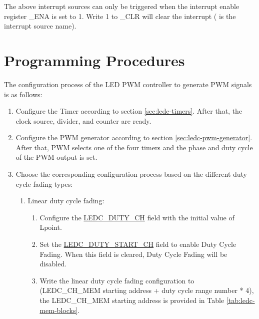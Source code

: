 \documentclass[main\_\_EN.tex]{subfiles}
\begin{document}
The above interrupt sources can only be triggered when the interrupt enable register \_ENA is set to 1. Write 1 to \_CLR will clear the interrupt ( is the interrupt source name).


\section{Programming Procedures}
\label{sec:ledc-prog-procedures}

The configuration process of the LED PWM controller to generate PWM signals is as follows:
\begin{enumerate}
    \item Configure the Timer according to section \ref{sec:ledc-timers}. After that, the clock source, divider, and counter are ready.
    \item Configure the PWM generator according to section \ref{sec:ledc-pwm-generator}. After that, PWM selects one of the four timers and the phase and duty cycle of the PWM output is set.
    \item Choose the corresponding configuration process based on the different duty cycle fading types:
    \begin{enumerate}
        \item Linear duty cycle fading:
            \begin{enumerate}
                \item Configure the \hyperref[fielddesc:LEDCDUTYCHN]{LEDC\_DUTY\_CH} field with the initial value of Lpoint.
                \item Set the \hyperref[fielddesc:LEDCDUTYSTARTCHN]{LEDC\_DUTY\_START\_CH} field to enable Duty Cycle Fading. When this field is cleared, Duty Cycle Fading will be disabled.
                \item Write the linear duty cycle fading configuration to (LEDC\_CH\_MEM starting address + duty cycle range number * 4), the LEDC\_CH\_MEM starting address is provided in Table \ref{tab:ledc-mem-blocks}. \\


\end{enumerate}
\end{enumerate}
\end{enumerate}
\end{document}
